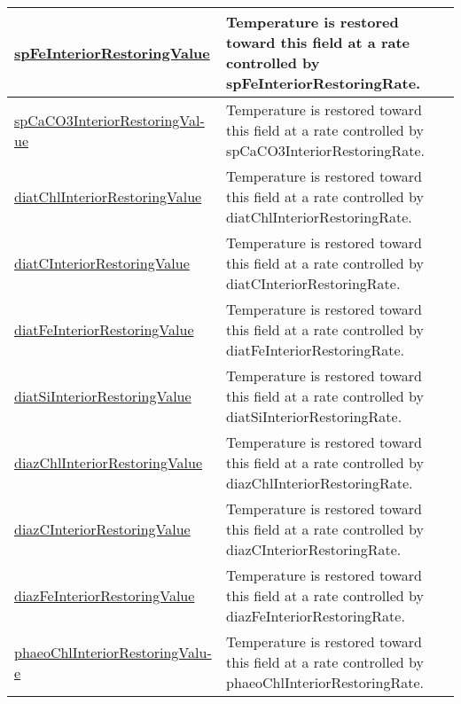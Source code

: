 {\begin{center}
\begin{longtable}{| p{2.0in} | p{4.0in} |}
    \hline
    \hyperref[subsec:var_sec_tracersInteriorRestoringFields_spFeInteriorRestoringValue]{spFeInteriorRestoringValue} & Temperature is restored toward this field at a rate controlled by spFeInteriorRestoringRate. \\
    \hline
    \hyperref[subsec:var_sec_tracersInteriorRestoringFields_spCaCO3InteriorRestoringValue]{spCaCO3InteriorRestoringVal-}\hyperref[subsec:var_sec_tracersInteriorRestoringFields_spCaCO3InteriorRestoringValue]{ue}  & Temperature is restored toward this field at a rate controlled by spCaCO3InteriorRestoringRate. \\
    \hline
    \hyperref[subsec:var_sec_tracersInteriorRestoringFields_diatChlInteriorRestoringValue]{diatChlInteriorRestoringValue} & Temperature is restored toward this field at a rate controlled by diatChlInteriorRestoringRate. \\
    \hline
    \hyperref[subsec:var_sec_tracersInteriorRestoringFields_diatCInteriorRestoringValue]{diatCInteriorRestoringValue} & Temperature is restored toward this field at a rate controlled by diatCInteriorRestoringRate. \\
    \hline
    \hyperref[subsec:var_sec_tracersInteriorRestoringFields_diatFeInteriorRestoringValue]{diatFeInteriorRestoringValue} & Temperature is restored toward this field at a rate controlled by diatFeInteriorRestoringRate. \\
    \hline
    \hyperref[subsec:var_sec_tracersInteriorRestoringFields_diatSiInteriorRestoringValue]{diatSiInteriorRestoringValue} & Temperature is restored toward this field at a rate controlled by diatSiInteriorRestoringRate. \\
    \hline
    \hyperref[subsec:var_sec_tracersInteriorRestoringFields_diazChlInteriorRestoringValue]{diazChlInteriorRestoringValue} & Temperature is restored toward this field at a rate controlled by diazChlInteriorRestoringRate. \\
    \hline
    \hyperref[subsec:var_sec_tracersInteriorRestoringFields_diazCInteriorRestoringValue]{diazCInteriorRestoringValue} & Temperature is restored toward this field at a rate controlled by diazCInteriorRestoringRate. \\
    \hline
    \hyperref[subsec:var_sec_tracersInteriorRestoringFields_diazFeInteriorRestoringValue]{diazFeInteriorRestoringValue} & Temperature is restored toward this field at a rate controlled by diazFeInteriorRestoringRate. \\
    \hline
    \hyperref[subsec:var_sec_tracersInteriorRestoringFields_phaeoChlInteriorRestoringValue]{phaeoChlInteriorRestoringValu-}\hyperref[subsec:var_sec_tracersInteriorRestoringFields_phaeoChlInteriorRestoringValue]{e}  & Temperature is restored toward this field at a rate controlled by phaeoChlInteriorRestoringRate. \\

\end{longtable}
\end{center}}
